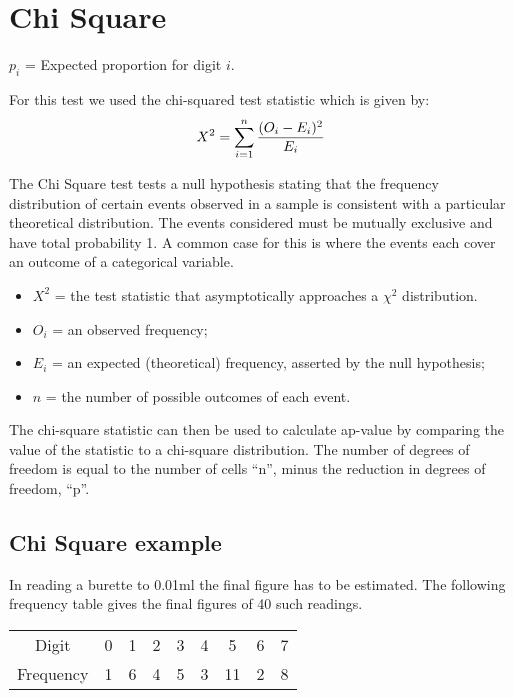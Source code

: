 \documentclass[00-IntroStatsMaster.tex]{subfiles}
\begin{document}
\section{Chi Square}


$p_{i}$ = Expected proportion for digit $i$.

For this test we used the chi-squared test statistic which is given by:
\begin{equation}
	X^2 = \sum_{i=1}^{n} {(O_i - E_i)^2 \over E_i}
\end{equation}


The Chi Square test tests a null hypothesis stating that the frequency distribution of certain events observed in a sample is consistent with a particular theoretical distribution. The events considered must be mutually exclusive and have total probability 1. A common case for this is where the events each cover an outcome of a categorical variable.

\begin{itemize}
	\item $X^2$ = the test statistic that asymptotically approaches a $\chi^2$ distribution.
	\item $O_i$ = an observed frequency;
	\item $E_i$ = an expected (theoretical) frequency, asserted by the null hypothesis;
	\item $n $  = the number of possible outcomes of each event.
\end{itemize}

The chi-square statistic can then be used to calculate ap-value by comparing the value of the statistic to a chi-square distribution. The number of degrees of freedom is equal to the number of cells ``n'', minus the reduction in degrees of freedom, ``p''.
\subsection{Chi Square example}
In reading a burette to 0.01ml the final figure has to be estimated.
The following frequency table gives the final figures of 40 such readings.

\begin{tabular}{|c|c|c|c|c|c|c|c|c|}
	\hline
	Digit & 0 & 1 & 2 & 3 & 4 & 5 & 6 & 7 \\
	Frequency& 1 & 6 & 4 & 5 & 3 & 11 & 2 & 8 \\
	\hline
\end{tabular}
\end{document}
